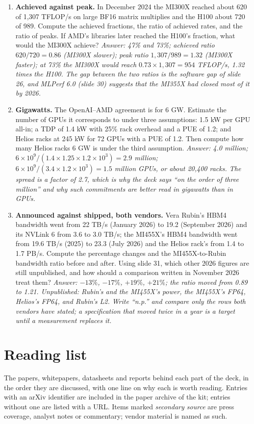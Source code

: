 \documentclass[11pt,letterpaper]{article}
\newcommand{\setstage}[1]{\colorlet{stagec}{#1}}
\begin{document}
\begin{enumerate}[leftmargin=1.6em,itemsep=6pt]
\item \textbf{Achieved against peak.} In December 2024 the MI300X reached about 620 of 1,307 TFLOP/s on large BF16 matrix multiplies and the H100 about 720 of 989. Compute the achieved fractions, the ratio of achieved rates, and the ratio of peaks. If AMD's libraries later reached the H100's fraction, what would the MI300X achieve? \emph{Answer: 47\% and 73\%; achieved ratio $620/720 = 0.86$ (MI300X slower); peak ratio $1{,}307/989 = 1.32$ (MI300X faster); at 73\% the MI300X would reach $0.73\times 1{,}307 = 954$ TFLOP/s, 1.32 times the H100. The gap between the two ratios is the software gap of slide 26, and MLPerf 6.0 (slide 30) suggests that the MI355X had closed most of it by 2026.}
\item \textbf{Gigawatts.} The OpenAI--AMD agreement is for 6 GW. Estimate the number of GPUs it corresponds to under three assumptions: 1.5 kW per GPU all-in; a TDP of 1.4 kW with 25\% rack overhead and a PUE of 1.2; and Helios racks at 245 kW for 72 GPUs with a PUE of 1.2. Then compute how many Helios racks 6 GW is under the third assumption. \emph{Answer: 4.0 million; $6\times 10^9/(1.4\times 1.25\times 1.2\times 10^3) = 2.9$ million; $6\times 10^9/(3.4\times 1.2\times 10^3) = 1.5$ million GPUs, or about 20,400 racks. The spread is a factor of 2.7, which is why the deck says ``on the order of three million'' and why such commitments are better read in gigawatts than in GPUs.}
\item \textbf{Announced against shipped, both vendors.} Vera Rubin's HBM4 bandwidth went from 22 TB/s (January 2026) to 19.2 (September 2026) and its NVLink 6 from 3.6 to 3.0 TB/s; the MI455X's HBM4 bandwidth went from 19.6 TB/s (2025) to 23.3 (July 2026) and the Helios rack's from 1.4 to 1.7 PB/s. Compute the percentage changes and the MI455X-to-Rubin bandwidth ratio before and after. Using slide 31, which other 2026 figures are still unpublished, and how should a comparison written in November 2026 treat them? \emph{Answer: $-13\%$, $-17\%$, $+19\%$, $+21\%$; the ratio moved from 0.89 to 1.21. Unpublished: Rubin's and the MI455X's power, the MI455X's FP64, Helios's FP64, and Rubin's L2. Write ``n.p.'' and compare only the rows both vendors have stated; a specification that moved twice in a year is a target until a measurement replaces it.}
\end{enumerate}
\clearpage
\setstage{ink}
\section{Reading list}
\label{app:reading}
The papers, whitepapers, datasheets and reports behind each part of the deck, in the order they are discussed, with one line on why each is worth reading. Entries with an arXiv identifier are included in the paper archive of the kit; entries without one are listed with a URL. Items marked \emph{secondary source} are press coverage, analyst notes or commentary; vendor material is named as such.
\end{document}
